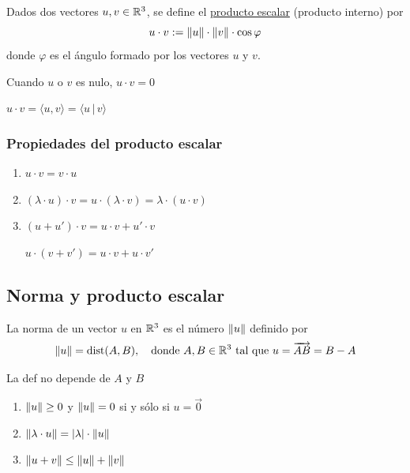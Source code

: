 \documentclass[11pt,a4paper]{article}
\DeclareMathOperator{\dist}{dist}
\begin{document}
\begin{definicion}
Dados dos vectores $u,v\in\mathbb{R}^3$, se define el \underline{producto escalar} (producto interno) por
\[
u\cdot v:=\lVert u\rVert\cdot\lVert v\rVert\cdot\cos\varphi
\]
donde $\varphi$ es el ángulo formado por los vectores $u$ y $v$.

Cuando $u$ o $v$ es nulo, \quad $u\cdot v=0$
\end{definicion}

\begin{notacion}
$u\cdot v=\langle u,v\rangle=\langle u\,|\,v\rangle$
\end{notacion}

\subsubsection*{Propiedades del producto escalar}

\begin{enumerate}[label=(\arabic*)]
  \item $u\cdot v=v\cdot u$
  \item $(\lambda\cdot u)\cdot v=u\cdot(\lambda\cdot v)=\lambda\cdot(u\cdot v)$
  \item $(u+u')\cdot v=u\cdot v+u'\cdot v$

  $u\cdot(v+v')=u\cdot v+u\cdot v'$
\end{enumerate}


\subsection{Norma y producto escalar}

\begin{definicion}
La norma de un vector $u$ en $\mathbb{R}^3$ es el número $\lVert u\rVert$ definido por
\[
\norm{u}=\dist(A,B),\quad\text{donde } A,B\in\R^3 \text{ tal que } u=\overrightarrow{AB}=B-A
\]
\end{definicion}

\begin{observacion}
La def no depende de $A$ y $B$
\end{observacion}

\begin{proposicion}\leavevmode
\begin{enumerate}[label=(\arabic*)]
  \item $\lVert u\rVert\geq0$ y $\lVert u\rVert=0$ si y sólo si $u=\vec0$
  \item $\lVert\lambda\cdot u\rVert=\lvert\lambda\rvert\cdot\lVert u\rVert$
  \item $\lVert u+v\rVert\leq\lVert u\rVert+\lVert v\rVert$
\end{enumerate}
\end{proposicion}
\end{document}
